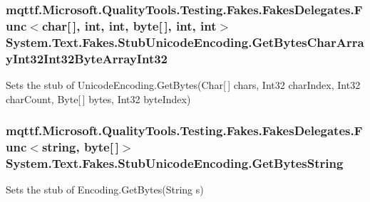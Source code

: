 \hypertarget{class_system_1_1_text_1_1_fakes_1_1_stub_unicode_encoding_ae44659d95f974299b64b6a416ff04481}{
\subsubsection[{Get\-Bytes\-Char\-Array\-Int32\-Int32\-Byte\-Array\-Int32}]{\setlength{\rightskip}{0pt plus 5cm}mqttf.\-Microsoft.\-Quality\-Tools.\-Testing.\-Fakes.\-Fakes\-Delegates.\-Func$<$char\mbox{[}$\,$\mbox{]}, int, int, byte\mbox{[}$\,$\mbox{]}, int, int$>$ System.\-Text.\-Fakes.\-Stub\-Unicode\-Encoding.\-Get\-Bytes\-Char\-Array\-Int32\-Int32\-Byte\-Array\-Int32}}\label{class_system_1_1_text_1_1_fakes_1_1_stub_unicode_encoding_ae44659d95f974299b64b6a416ff04481}


Sets the stub of Unicode\-Encoding.\-Get\-Bytes(\-Char\mbox{[}$\,$\mbox{]} chars, Int32 char\-Index, Int32 char\-Count, Byte\mbox{[}$\,$\mbox{]} bytes, Int32 byte\-Index)

\hypertarget{class_system_1_1_text_1_1_fakes_1_1_stub_unicode_encoding_a2e8bce207e8d4992c115023e925e0b47}{
\subsubsection[{Get\-Bytes\-String}]{\setlength{\rightskip}{0pt plus 5cm}mqttf.\-Microsoft.\-Quality\-Tools.\-Testing.\-Fakes.\-Fakes\-Delegates.\-Func$<$string, byte\mbox{[}$\,$\mbox{]}$>$ System.\-Text.\-Fakes.\-Stub\-Unicode\-Encoding.\-Get\-Bytes\-String}}\label{class_system_1_1_text_1_1_fakes_1_1_stub_unicode_encoding_a2e8bce207e8d4992c115023e925e0b47}


Sets the stub of Encoding.\-Get\-Bytes(\-String s)

